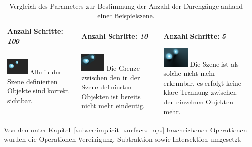 \begin{table}[H]
    \centering
    \caption{Vergleich des Parameters zur Bestimmung der Anzahl der
        Durchgänge anhand einer Beispielszene.}\label{table:sphere_tracing_steps}
    \begin{tabular}{p{}p{}p{}}
        \toprule
            \textbf{Anzahl Schritte: \textit{100}} &
            \textbf{Anzahl Schritte: \textit{10}}  &
            \textbf{Anzahl Schritte: \textit{5}}   \\
        \cmidrule(r){1-1}\cmidrule(lr){2-2}\cmidrule(l){3-3}
            \includegraphics[width=0.3\textwidth]{img/sphere_tracing_steps_full.png} \newline
            Alle in der Szene definierten Objekte sind korrekt sichtbar. &
            \includegraphics[width=0.3\textwidth]{img/sphere_tracing_steps_less.png} \newline
            Die Grenze zwischen den in der Szene definierten Objekten
            ist bereits nicht mehr eindeutig. &
            \includegraphics[width=0.3\textwidth]{img/sphere_tracing_steps_min.png} \newline
            Die Szene ist als solche nicht mehr erkennbar, es erfolgt
            keine klare Trennung zwischen den einzelnen Objekten mehr.  \\
        \bottomrule
    \end{tabular}
\end{table}

Von den unter Kapitel~\ref{subsec:implicit_surfaces_ops} beschriebenen
Operationen wurden die Operationen Vereinigung, Subtraktion sowie Intersektion
umgesetzt.

